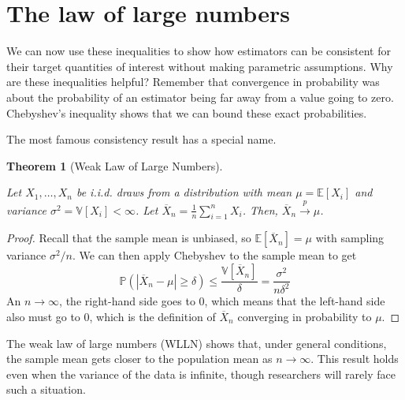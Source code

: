 \documentclass[
  letterpaper,
  DIV=11,
  numbers=noendperiod]{scrreprt}
\newcommand{\E}{\mathbb{E}}
\newcommand{\V}{\mathbb{V}}
\renewcommand{\P}{\mathbb{P}}
\newcommand{\Xbar}{\overline{X}}
\newcommand{\inprob}{\overset{p}{\to}}
\theoremstyle{definition}
\theoremstyle{definition}
\theoremstyle{plain}
\newtheorem{theorem}{Theorem}[chapter]
\theoremstyle{remark}
\begin{document}
\hypertarget{the-law-of-large-numbers}{%
\section{The law of large numbers}\label{the-law-of-large-numbers}}

We can now use these inequalities to show how estimators can be
consistent for their target quantities of interest without making
parametric assumptions. Why are these inequalities helpful? Remember
that convergence in probability was about the probability of an
estimator being far away from a value going to zero. Chebyshev's
inequality shows that we can bound these exact probabilities.

The most famous consistency result has a special name.

\begin{theorem}[Weak Law of Large
Numbers]\protect\hypertarget{thm-lln}{}\label{thm-lln}

Let \(X_1, \ldots, X_n\) be i.i.d. draws from a distribution with mean
\(\mu = \E[X_i]\) and variance \(\sigma^2 = \V[X_i] < \infty\). Let
\(\Xbar_n = \frac{1}{n} \sum_{i =1}^n X_i\). Then,
\(\Xbar_n \inprob \mu\).

\end{theorem}

\begin{proof}

Recall that the sample mean is unbiased, so \(\E[\Xbar_n] = \mu\) with
sampling variance \(\sigma^2/n\). We can then apply Chebyshev to the
sample mean to get \[
\P(|\Xbar_n - \mu| \geq \delta) \leq \frac{\V[\Xbar_n]}{\delta} = \frac{\sigma^2}{n\delta^2}
\] An \(n\rightarrow\infty\), the right-hand side goes to 0, which means
that the left-hand side also must go to 0, which is the definition of
\(\Xbar_n\) converging in probability to \(\mu\).

\end{proof}

The weak law of large numbers (WLLN) shows that, under general
conditions, the sample mean gets closer to the population mean as
\(n\rightarrow\infty\). This result holds even when the variance of the
data is infinite, though researchers will rarely face such a situation.
\end{document}
